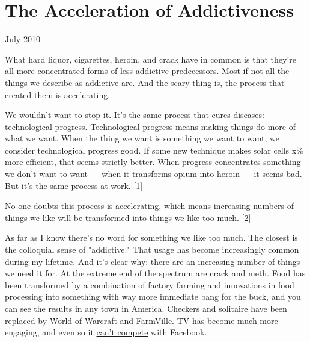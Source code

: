\chapter{The Acceleration of Addictiveness}


            
              
                

July 2010

What hard liquor, cigarettes, heroin,
                  and crack have in common is that they're all more concentrated
                  forms of less addictive predecessors. Most if not all the
                  things we describe as addictive are. And the scary thing is,
                  the process that created them is accelerating.

We
                  wouldn't want to stop it. It's the same process that cures
                  diseases: technological progress. Technological progress means
                  making things do more of what we want. When the thing we want
                  is something we want to want, we consider technological
                  progress good. If some new technique makes solar cells x\% more
                  efficient, that seems strictly better. When progress
                  concentrates something we don't want to want --- when it
                  transforms opium into heroin --- it seems bad. But it's
                  the same process at work.
                  [\href{\#f1n}{1}]

No one doubts this process is accelerating, which
                  means increasing numbers of things we like will be transformed
                  into things we like too much.
                  [\href{\#f2n}{2}]

As far as I know there's no word for something we
                  like too much. The closest is the colloquial sense of
                  "addictive." That usage has become increasingly common during
                  my lifetime. And it's clear why: there are an increasing
                  number of things we need it for. At the extreme end of the
                  spectrum are crack and meth. Food has been transformed by a
                  combination of factory farming and innovations in food
                  processing into something with way more immediate bang for the
                  buck, and you can see the results in any town in America.
                  Checkers and solitaire have been replaced by World of Warcraft
                  and FarmVille. TV has become much more engaging, and even so
                  it \href{http://www.paulgraham.com/convergence.html}{can't compete} with
                  Facebook.

